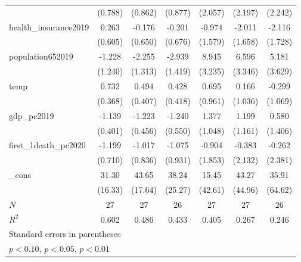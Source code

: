 {\begin{tabular}{l*{6}{c}}
            &     (0.788)         &     (0.862)         &     (0.877)         &     (2.057)         &     (2.197)         &     (2.242)         \\
[1em]
health\_insurance2019&       0.263         &      -0.176         &      -0.201         &      -0.974         &      -2.011         &      -2.116         \\
            &     (0.605)         &     (0.650)         &     (0.676)         &     (1.579)         &     (1.658)         &     (1.728)         \\
[1em]
population652019&      -1.228         &      -2.255         &      -2.939\sym{*}  &       8.945\sym{**} &       6.596\sym{*}  &       5.181         \\
            &     (1.240)         &     (1.313)         &     (1.419)         &     (3.235)         &     (3.346)         &     (3.629)         \\
[1em]
temp        &       0.732\sym{*}  &       0.494         &       0.428         &       0.695         &       0.166         &      -0.299         \\
            &     (0.368)         &     (0.407)         &     (0.418)         &     (0.961)         &     (1.036)         &     (1.069)         \\
[1em]
gdp\_pc2019  &      -1.139\sym{**} &      -1.223\sym{**} &      -1.240\sym{**} &       1.377         &       1.199         &       0.580         \\
            &     (0.401)         &     (0.456)         &     (0.550)         &     (1.048)         &     (1.161)         &     (1.406)         \\
[1em]
first\_1death\_pc2020&      -1.199         &      -1.017         &      -1.075         &      -0.904         &      -0.383         &      -0.262         \\
            &     (0.710)         &     (0.836)         &     (0.931)         &     (1.853)         &     (2.132)         &     (2.381)         \\
[1em]
\_cons      &       31.30\sym{*}  &       43.65\sym{**} &       38.24         &       15.45         &       43.27         &       35.91         \\
            &     (16.33)         &     (17.64)         &     (25.27)         &     (42.61)         &     (44.96)         &     (64.62)         \\
\hline
\(N\)       &          27         &          27         &          26         &          27         &          27         &          26         \\
\(R^{2}\)   &       0.602         &       0.486         &       0.433         &       0.405         &       0.267         &       0.246         \\
\hline\hline
\multicolumn{7}{l}{\footnotesize Standard errors in parentheses}\\
\multicolumn{7}{l}{\footnotesize \sym{*} \(p<0.10\), \sym{**} \(p<0.05\), \sym{***} \(p<0.01\)}\\
\end{tabular}
}
